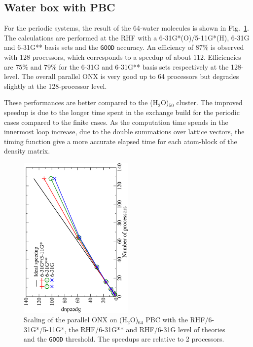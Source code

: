 \documentclass[prl,twocolumn,showpacs,twocolumngrid,superbib]{revtex4}
\begin{document}
\subsection{Water box with PBC}
 For the periodic systems, the result of the 64-water molecules is shown
 in Fig.~\ref{fig:h2o_pbc_64}. The calculations are performed at the
 RHF with a 6-31G*(O)/5-11G*(H), 6-31G and 6-31G** basis sets and the {\tt GOOD} accuracy. 
 An efficiency of $87\%$ is observed with 128 processors, which corresponds to
 a speedup of about $112$. Efficiencies are $75\%$ and $79\%$ for the 6-31G and 6-31G** 
 basis sets respectively at the 128-level. The overall parallel ONX is very
 good up to 64 processors but degrades slightly at the 128-processor level.

 These performances are better compared to the (H$_2$O)$_{50}$ cluster. The 
 improved speedup is due to the longer time spent in the
 exchange build for the periodic cases compared 
 to the finite cases. As the computation time spends in the innermost loop 
 increase, due to the double summations over lattice vectors,
 the timing function give a more accurate elapsed time for each 
 atom-block of the density matrix.\\

\begin{figure}[p]
  \caption{\protect
    Scaling of the parallel ONX on (H$_2$O)$_{64}$ PBC with the RHF/6-31G*/5-11G*,
    the RHF/6-31G** and RHF/6-31G level of theories and the {\tt GOOD} threshold. 
    The speedups are relative to 2 processors.
  }\label{fig:h2o_pbc_64}
  \includegraphics[angle=-90,width=0.5\textwidth]{h2o_pbc_64}
\end{figure}
\end{document}
